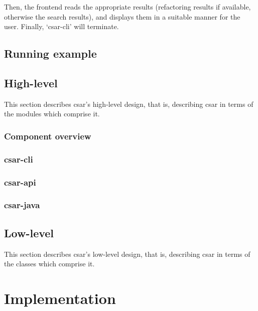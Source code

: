 \documentclass[12pt, letterpaper]{article}
\begin{document}
Then, the frontend reads the appropriate results (refactoring results if available, otherwise the search results), and displays them in a suitable manner for the user.
Finally, `csar-cli' will terminate.

\subsection{Running example}

\subsection{High-level}
This section describes csar's high-level design, that is, describing csar in terms of the modules which comprise it.

\subsubsection{Component overview}

\subsubsection{csar-cli}

\subsubsection{csar-api}

\subsubsection{csar-java}

\subsection{Low-level}
This section describes csar's low-level design, that is, describing csar in terms of the classes which comprise it.


\section{Implementation}
\end{document}
